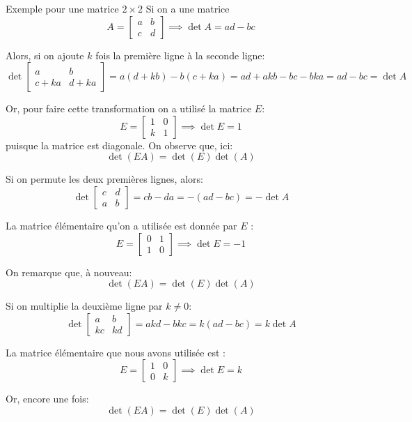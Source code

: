 \documentclass[a4paper]{article}
\begin{document}
\begin{parag}{Exemple pour une matrice $2\times2$}
    Si on a une matrice
    \[A = \begin{bmatrix} a & b \\ c & d \end{bmatrix} \implies \det A = ad - bc\]

     Alors, si on ajoute $k$ fois la première ligne à la seconde ligne:
    \[\det \begin{bmatrix} a & b \\ c + ka & d + ka \end{bmatrix} = a\left(d + kb\right) - b\left(c + ka\right) = ad + akb - bc - bka = ad - bc = \det A\]

    Or, pour faire cette transformation on a utilisé la matrice $E$:
    \[E = \begin{bmatrix} 1 & 0 \\ k & 1 \end{bmatrix} \implies \det E = 1\]
    puisque la matrice est diagonale. On observe que, ici:
    \[\det\left(EA\right) = \det\left(E\right)\det\left(A\right)\]

    \vspace{1em}

     Si on permute les deux premières lignes, alors:
    \[\det \begin{bmatrix} c & d \\ a & b \end{bmatrix} = cb - da = -\left(ad - bc\right) = -\det A\]

    La matrice élémentaire qu'on a utilisée est donnée par $E$ :
    \[E = \begin{bmatrix} 0 & 1 \\ 1 & 0 \end{bmatrix} \implies \det E = -1\]

    On remarque que, à nouveau:
    \[\det\left(EA\right) = \det\left(E\right)\det\left(A\right)\]

    \vspace{1em}

     Si on multiplie la deuxième ligne par $k \neq 0$:
    \[\det \begin{bmatrix} a & b \\ kc & kd \end{bmatrix} = akd - bkc = k\left(ad - bc\right) = k\det A\]

    La matrice élémentaire que nous avons utilisée est :
    \[E = \begin{bmatrix} 1 & 0 \\ 0 & k \end{bmatrix} \implies \det E = k\]

    Or, encore une fois:
    \[\det\left(EA\right) = \det\left(E\right)\det\left(A\right)\]


\end{parag}
\end{document}
